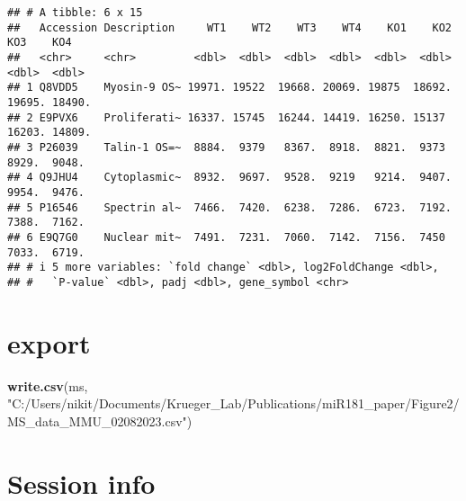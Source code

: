 \documentclass[
]{article}
\newenvironment{Shaded}{\begin{snugshade}}{\end{snugshade}}
\newcommand{\FunctionTok}[1]{\textcolor[rgb]{0.13,0.29,0.53}{\textbf{#1}}}
\newcommand{\NormalTok}[1]{#1}
\newcommand{\OtherTok}[1]{\textcolor[rgb]{0.56,0.35,0.01}{#1}}
\newcommand{\SpecialCharTok}[1]{\textcolor[rgb]{0.81,0.36,0.00}{\textbf{#1}}}
\newcommand{\StringTok}[1]{\textcolor[rgb]{0.31,0.60,0.02}{#1}}
\begin{document}
\begin{Shaded}
\end{Shaded}

\begin{verbatim}
## # A tibble: 6 x 15
##   Accession Description     WT1    WT2    WT3    WT4    KO1    KO2    KO3    KO4
##   <chr>     <chr>         <dbl>  <dbl>  <dbl>  <dbl>  <dbl>  <dbl>  <dbl>  <dbl>
## 1 Q8VDD5    Myosin-9 OS~ 19971. 19522  19668. 20069. 19875  18692. 19695. 18490.
## 2 E9PVX6    Proliferati~ 16337. 15745  16244. 14419. 16250. 15137  16203. 14809.
## 3 P26039    Talin-1 OS=~  8884.  9379   8367.  8918.  8821.  9373   8929.  9048.
## 4 Q9JHU4    Cytoplasmic~  8932.  9697.  9528.  9219   9214.  9407.  9954.  9476.
## 5 P16546    Spectrin al~  7466.  7420.  6238.  7286.  6723.  7192.  7388.  7162.
## 6 E9Q7G0    Nuclear mit~  7491.  7231.  7060.  7142.  7156.  7450   7033.  6719.
## # i 5 more variables: `fold change` <dbl>, log2FoldChange <dbl>,
## #   `P-value` <dbl>, padj <dbl>, gene_symbol <chr>
\end{verbatim}

\hypertarget{export}{%
\section{export}\label{export}}

\begin{Shaded}
\begin{Highlighting}[]
\FunctionTok{write.csv}\NormalTok{(ms, }\StringTok{"C:/Users/nikit/Documents/Krueger\_Lab/Publications/miR181\_paper/Figure2/MS\_data\_MMU\_02082023.csv"}\NormalTok{)}
\end{Highlighting}
\end{Shaded}

\hypertarget{session-info}{%
\section{Session info}\label{session-info}}
\end{document}
